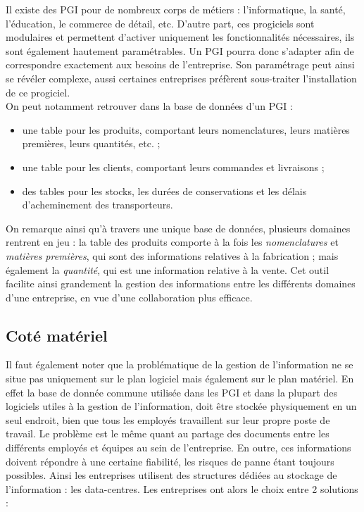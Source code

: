Il existe des PGI pour de nombreux corps de métiers : l'informatique, la santé, l'éducation, le commerce de détail, etc. D'autre part, ces progiciels sont modulaires et permettent d'activer uniquement les fonctionnalités nécessaires, ils sont également hautement paramétrables. Un PGI pourra donc s'adapter afin de correspondre exactement aux besoins de l'entreprise. Son paramétrage peut ainsi se révéler complexe, aussi certaines entreprises préfèrent sous-traiter l'installation de ce progiciel.\\

On peut notamment retrouver dans la base de données d'un PGI :

\begin{itemize}
\item une table pour les produits, comportant leurs nomenclatures, leurs matières premières, leurs quantités, etc. ;
\item une table pour les clients, comportant leurs commandes et livraisons ;
\item des tables pour les stocks, les durées de conservations et les délais d'acheminement des transporteurs.
\end{itemize}

On remarque ainsi qu'à travers une unique base de données, plusieurs domaines rentrent en jeu : la table des produits comporte à la fois les \textit{nomenclatures} et \textit{matières premières}, qui sont des informations relatives à la fabrication ; mais également la \textit{quantité}, qui est une information relative à la vente. Cet outil facilite ainsi grandement la gestion des informations entre les différents domaines d'une entreprise, en vue d'une collaboration plus efficace.

\subsection{Coté matériel}

Il faut également noter que la problématique de la gestion de l'information ne se situe pas uniquement sur le plan logiciel mais également sur le plan matériel. En effet la base de donnée commune utilisée dans les PGI et dans la plupart des logiciels utiles à la gestion de l'information, doit être stockée physiquement en un seul endroit, bien que tous les employés travaillent sur leur propre poste de travail. Le problème est le même quant au partage des documents entre les différents employés et équipes au sein de l'entreprise. En outre, ces informations doivent répondre à une certaine fiabilité, les risques de panne étant toujours possibles. Ainsi les entreprises utilisent des structures dédiées au stockage de l'information : les data-centres. Les entreprises ont alors le choix entre 2 solutions :

